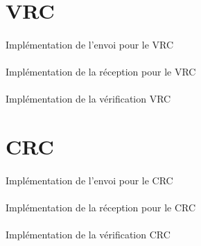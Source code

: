     \section{VRC}

        \paragraph{}
Implémentation de l'envoi pour le VRC


    \clearpage
        \paragraph{}
Implémentation de la réception pour le VRC


    \clearpage
        \paragraph{}
Implémentation de la vérification VRC


    \clearpage




    \section{CRC}

        \paragraph{}
Implémentation de l'envoi pour le CRC


    \clearpage

        \paragraph{}
Implémentation de la réception pour le CRC


    \clearpage

        \paragraph{}
Implémentation de la vérification CRC


    \clearpage{}
